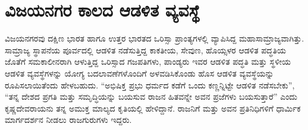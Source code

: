 \section{ವಿಜಯನಗರ ಕಾಲದ ಆಡಳಿತ ವ್ಯವಸ್ಥೆ}

ವಿಜಯನಗರವು ದಕ್ಷಿಣ ಭಾರತ ಹಾಗೂ ಉತ್ತರ ಭಾರತದ ಒರಿಸ್ಸಾ ಪ್ರಾಂತ್ಯಗಳಲ್ಲಿ ವ್ಯಾಪಿಸಿದ್ದ ಮಹಾಸಾಮ್ರಾಜ್ಯವಾಗಿತ್ತು. ಸಾಮ್ರಾಜ್ಯ ಸ್ಥಾಪನೆಯ ಪೂರ್ವದಲ್ಲಿ ಆಡಳಿತ ನಡೆಸುತ್ತಿದ್ದ ಕಾಕತೀಯ, ಸೇವುಣ, ಹೊಯ್ಸಳರ ಆಡಳಿತ ಪದ್ಧತಿಯ ಜೊತೆಗೆ ಸಮಕಾಲೀನರಾಗಿ ಆಳುತ್ತಿದ್ದ ಒರಿಸ್ಸಾದ ಗಜಪತಿಗಳು, ಪಾಂಡ್ಯರು ಇವರ ಆಡಳಿತ ಪದ್ಧತಿ ಮತ್ತು ಸ್ಥಳೀಯ ಆಡಳಿತ ವ್ಯವಸ್ಥೆಗಳನ್ನು ಯೋಗ್ಯ ಬದಲಾವಣೆಗಳೊಂದಿಗೆ ಅಳವಡಿಸಿಕೊಂಡು ಹೊಸ ಆಡಳಿತ ವ್ಯವಸ್ಥೆಯನ್ನು ರೂಪಿಸಲಾಯಿತೆಂದು ಹೇಳಬಹುದು. “ಅಭಿಷಿಕ್ತ ಪ್ರಭು ಧರ್ಮದ ಕಡೆಗೆ ಒಂದು ಕಣ್ಣನ್ನಿಟ್ಟೇ ಆಡಳಿತ ನಡೆಸಬೇಕು”, “ತನ್ನ ದೇಶದ ಪ್ರಗತಿ ಮತ್ತು ಸಮೃದ್ಧಿಯನ್ನು ಬಯಸುವ ರಾಜನ ಹಿತವನ್ನೇ ಅವನ ಪ್ರಜೆಗಳು ಬಯಸುತ್ತಾರೆ” ಎಂದು ಕೃಷ್ಣದೇವರಾಯನು ತನ್ನ ಅಮುಕ್ತ ಮಾಲ್ಯದ ಕೃತಿಯಲ್ಲಿ ಹೇಳಿದ್ದಾನೆ. ರಾಜನಿಗೆ ಮತ್ತು ಅವನ ಪ್ರತಿನಿಧಿಗಳಿಗೆ ಧಾರ್ಮಿಕ ಮಾರ್ಗದರ್ಶನ ನೀಡಲು ರಾಜಗುರುಗಳು ಇದ್ದರು.

